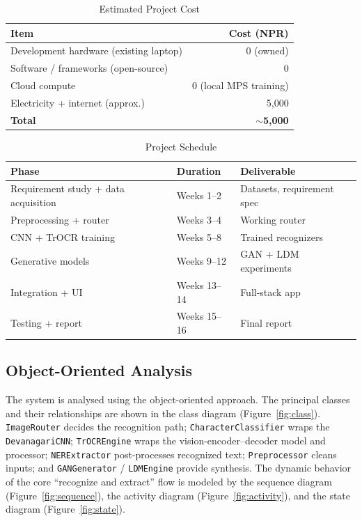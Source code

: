 \documentclass[12pt,a4paper]{report}
\begin{document}
\begin{table}[htbp]
\centering
\caption{Estimated Project Cost}
\label{tab:cost}
\small
\begin{tabular}{p{8cm}r}
\toprule
\textbf{Item} & \textbf{Cost (NPR)} \\
\midrule
Development hardware (existing laptop) & 0 (owned) \\
Software / frameworks (open-source) & 0 \\
Cloud compute & 0 (local MPS training) \\
Electricity + internet (approx.) & 5{,}000 \\
\midrule
\textbf{Total} & \textbf{$\sim$5{,}000} \\
\bottomrule
\end{tabular}
\end{table}

\begin{table}[htbp]
\centering
\caption{Project Schedule}
\label{tab:schedule}
\small
\begin{tabular}{p{6cm}p{3cm}p{4.5cm}}
\toprule
\textbf{Phase} & \textbf{Duration} & \textbf{Deliverable} \\
\midrule
Requirement study + data acquisition & Weeks 1--2 & Datasets, requirement spec \\
Preprocessing + router & Weeks 3--4 & Working router \\
CNN + TrOCR training & Weeks 5--8 & Trained recognizers \\
Generative models & Weeks 9--12 & GAN + LDM experiments \\
Integration + UI & Weeks 13--14 & Full-stack app \\
Testing + report & Weeks 15--16 & Final report \\
\bottomrule
\end{tabular}
\end{table}

\subsection{Object-Oriented Analysis}
The system is analysed using the object-oriented approach. The principal classes and their relationships are shown in the class diagram (Figure~\ref{fig:class}). \texttt{ImageRouter} decides the recognition path; \texttt{CharacterClassifier} wraps the \texttt{DevanagariCNN}; \texttt{TrOCREngine} wraps the vision-encoder--decoder model and processor; \texttt{NERExtractor} post-processes recognized text; \texttt{Preprocessor} cleans inputs; and \texttt{GANGenerator} / \texttt{LDMEngine} provide synthesis. The dynamic behavior of the core ``recognize and extract'' flow is modeled by the sequence diagram (Figure~\ref{fig:sequence}), the activity diagram (Figure~\ref{fig:activity}), and the state diagram (Figure~\ref{fig:state}).
\end{document}
